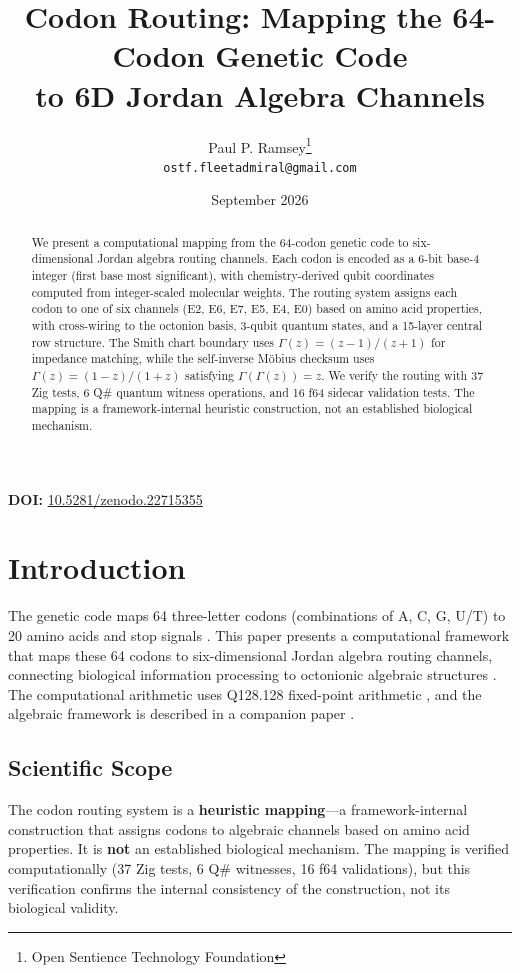 \documentclass[11pt]{article}
\title{Codon Routing: Mapping the 64-Codon Genetic Code \\
to 6D Jordan Algebra Channels}
\author{
Paul P. Ramsey\thanks{Open Sentience Technology Foundation} \\
\texttt{ostf.fleetadmiral@gmail.com}
}
\date{September 2026}
\begin{document}
\maketitle

\noindent\textbf{DOI:} \href{https://doi.org/10.5281/zenodo.22715355}{10.5281/zenodo.22715355}

\begin{abstract}
We present a computational mapping from the 64-codon genetic code to six-dimensional Jordan algebra routing channels. Each codon is encoded as a 6-bit base-4 integer (first base most significant), with chemistry-derived qubit coordinates computed from integer-scaled molecular weights. The routing system assigns each codon to one of six channels (E2, E6, E7, E5, E4, E0) based on amino acid properties, with cross-wiring to the octonion basis, 3-qubit quantum states, and a 15-layer central row structure. The Smith chart boundary uses $\Gamma(z) = (z-1)/(z+1)$ for impedance matching, while the self-inverse M\"obius checksum uses $\Gamma(z) = (1-z)/(1+z)$ satisfying $\Gamma(\Gamma(z)) = z$. We verify the routing with 37 Zig tests, 6 Q\# quantum witness operations, and 16 f64 sidecar validation tests. The mapping is a framework-internal heuristic construction, not an established biological mechanism.
\end{abstract}

\tableofcontents
\newpage

\section{Introduction}

The genetic code maps 64 three-letter codons (combinations of A, C, G, U/T) to 20 amino acids and stop signals \cite{crick1968codon}. This paper presents a computational framework that maps these 64 codons to six-dimensional Jordan algebra routing channels, connecting biological information processing to octonionic algebraic structures \cite{petoukhov2011, frontiers2024codon}. The computational arithmetic uses Q128.128 fixed-point arithmetic \cite{ramsey2026q128}, and the algebraic framework is described in a companion paper \cite{ramsey2026framework}.

\subsection{Scientific Scope}

The codon routing system is a \textbf{heuristic mapping}---a framework-internal construction that assigns codons to algebraic channels based on amino acid properties. It is \textbf{not} an established biological mechanism. The mapping is verified computationally (37 Zig tests, 6 Q\# witnesses, 16 f64 validations), but this verification confirms the internal consistency of the construction, not its biological validity.
\end{document}
